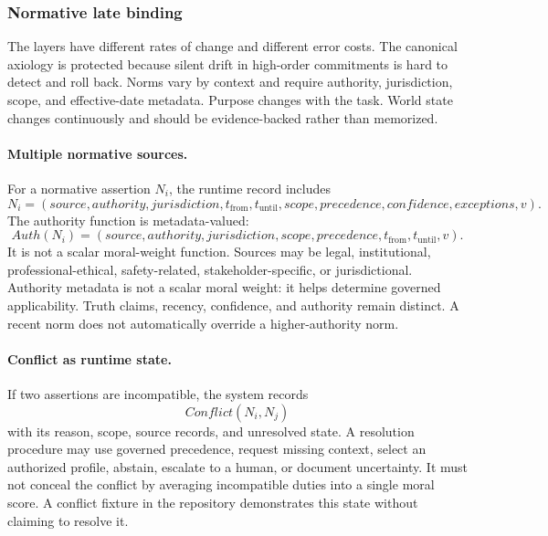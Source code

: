 \subsubsection{Normative late binding}
\label{sec:late-binding}

The layers have different rates of change and different error costs. The canonical axiology is protected because silent drift in high-order commitments is hard to detect and roll back. Norms vary by context and require authority, jurisdiction, scope, and effective-date metadata. Purpose changes with the task. World state changes continuously and should be evidence-backed rather than memorized.

\paragraph{Multiple normative sources.}

For a normative assertion $N_i$, the runtime record includes
\[
  N_i=(\mathit{source},\mathit{authority},\mathit{jurisdiction},
  t_{\mathrm{from}},t_{\mathrm{until}},\mathit{scope},
  \mathit{precedence},\mathit{confidence},\mathit{exceptions},v).
\]
The authority function is metadata-valued:
\[
  \mathit{Auth}(N_i)=
  (\mathit{source},\mathit{authority},\mathit{jurisdiction},
  \mathit{scope},\mathit{precedence},t_{\mathrm{from}},t_{\mathrm{until}},v).
\]
It is not a scalar moral-weight function.
Sources may be legal, institutional, professional-ethical, safety-related, stakeholder-specific, or jurisdictional. Authority metadata is not a scalar moral weight: it helps determine governed applicability. Truth claims, recency, confidence, and authority remain distinct. A recent norm does not automatically override a higher-authority norm.

\paragraph{Conflict as runtime state.}

If two assertions are incompatible, the system records
\[
  \mathit{Conflict}(N_i,N_j)
\]
with its reason, scope, source records, and unresolved state. A resolution procedure may use governed precedence, request missing context, select an authorized profile, abstain, escalate to a human, or document uncertainty. It must not conceal the conflict by averaging incompatible duties into a single moral score. A conflict fixture in the repository demonstrates this state without claiming to resolve it.

